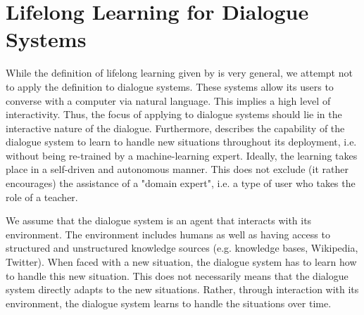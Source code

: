 \documentclass{lihlith}
\theoremstyle{definition}
\theoremstyle{remark}
\begin{document}
\section{Lifelong Learning for Dialogue Systems}
\label{sec:LL4DS}
While the definition of lifelong learning given by \cite{Chen:2016:LML:3086758} is very general, we attempt not to apply the definition to dialogue systems. These systems allow its users to converse with a computer via natural language. This implies a high level of interactivity. Thus, the focus of applying \LLL to dialogue systems should lie in the interactive nature of the dialogue. Furthermore, \LLL describes the capability of the dialogue system to learn to handle new situations throughout its deployment, i.e. without being re-trained by a machine-learning expert. Ideally, the learning takes place in a self-driven and autonomous manner. This does not exclude (it rather encourages) the assistance of a "domain expert", i.e. a type of user who takes the role of a teacher. 

We assume that the dialogue system is an agent that interacts with its environment. The environment includes humans as well as having access to structured and unstructured knowledge sources (e.g. knowledge bases, Wikipedia, Twitter).
When faced with a new situation, the dialogue system has to learn how to handle this new situation. This does not necessarily means that the dialogue system directly adapts to the new situations. Rather, through interaction with its environment, the dialogue system learns to handle the situations over time. 
\end{document}
